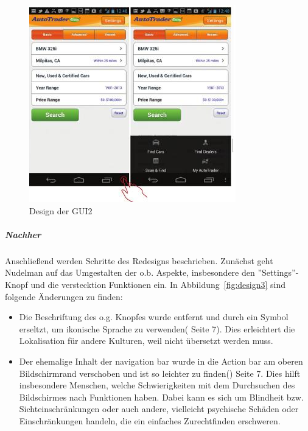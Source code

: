 \begin{figure}[h]
 \centering
 \includegraphics[height=0.40\textheight]{img/Design2.png}
 \caption{Design der GUI2}
 \label{fig:design2}
\end{figure}

\subparagraph{Nachher}
\label{subp:nachher}
Anschließend werden Schritte des Redesigns beschrieben. Zunächst geht Nudelman auf das Umgestalten der o.b. Aspekte, insbesondere den ''Settings''-Knopf und die verstecktion Funktionen ein. In Abbildung~\ref{fig:design3} sind folgende Änderungen zu finden: \\
\begin{itemize}
\item Die Beschriftung des o.g. Knopfes wurde entfernt und durch ein Symbol erseltzt, um ikonische Sprache zu verwenden(\cite{AndroidDesignPatterns} Seite 7). Dies erleichtert die Lokalisation für andere Kulturen, weil nicht übersetzt werden muss. 
\item Der ehemalige Inhalt der navigation bar wurde in die Action bar am oberen Bildschirmrand verschoben und ist so leichter zu finden(\cite{AndroidDesignPatterns}) Seite 7. Dies hilft insbesondere Menschen, welche Schwierigkeiten mit dem Durchsuchen des Bildschirmes nach Funktionen haben. Dabei kann es sich um Blindheit bzw. Sichteinschränkungen oder auch andere, vielleicht psychische Schäden oder Einschränkungen handeln, die ein einfaches Zurechtfinden erschweren.
\end{itemize}

